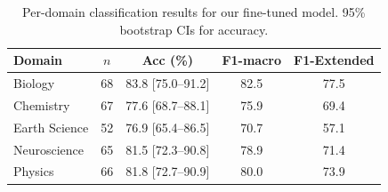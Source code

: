 \begin{table}[t]
\centering
\small
\caption{Per-domain classification results for our fine-tuned model. 95\% bootstrap CIs for accuracy.}
\label{tab:domain_results}
\begin{tabular}{lcccc}
\toprule
\textbf{Domain} & \textbf{$n$} & \textbf{Acc (\%)} & \textbf{F1-macro} & \textbf{F1-Extended} \\
\midrule
  Biology & 68 & 83.8 [75.0--91.2] & 82.5 & 77.5 \\
  Chemistry & 67 & 77.6 [68.7--88.1] & 75.9 & 69.4 \\
  Earth Science & 52 & 76.9 [65.4--86.5] & 70.7 & 57.1 \\
  Neuroscience & 65 & 81.5 [72.3--90.8] & 78.9 & 71.4 \\
  Physics & 66 & 81.8 [72.7--90.9] & 80.0 & 73.9 \\
\bottomrule
\end{tabular}
\end{table}